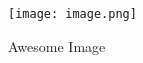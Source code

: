 \documentclass{article}
\begin{document}
\begin{figure}[p]
    \centering
    \texttt{[image: image.png]}
    \caption{Awesome Image}
    \label{fig:awesome_image}
\end{figure}
\end{document}
